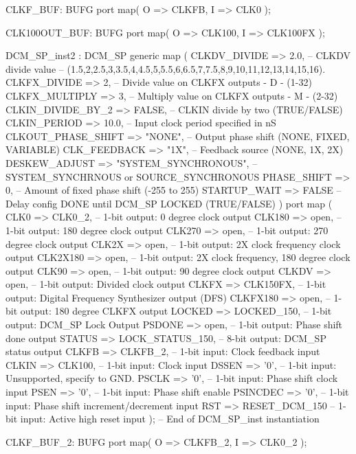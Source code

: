 \begin{mylisting}[language=VHDL,caption=トップモジュール,label=appF_Top_module_VHDL]
{{{	CLKF_BUF: BUFG
		port map(
			O => CLKFB,
			I => CLK0
			);

	CLK100OUT_BUF: BUFG
	port map(
			O	=> CLK100,
			I	=> CLK100FX
			);



	DCM_SP_inst2 : DCM_SP
		generic map (
			CLKDV_DIVIDE 			=> 2.0, 					-- CLKDV divide value
																-- (1.5,2,2.5,3,3.5,4,4.5,5,5.5,6,6.5,7,7.5,8,9,10,11,12,13,14,15,16).
			CLKFX_DIVIDE 			=> 2, 						-- Divide value on CLKFX outputs - D - (1-32)
			CLKFX_MULTIPLY 			=> 3, 						-- Multiply value on CLKFX outputs - M - (2-32)
			CLKIN_DIVIDE_BY_2 		=> FALSE, 					-- CLKIN divide by two (TRUE/FALSE)
			CLKIN_PERIOD 			=> 10.0, 					-- Input clock period specified in nS
			CLKOUT_PHASE_SHIFT 		=> "NONE", 					-- Output phase shift (NONE, FIXED, VARIABLE)
			CLK_FEEDBACK 			=> "1X", 					-- Feedback source (NONE, 1X, 2X)
			DESKEW_ADJUST 			=> "SYSTEM_SYNCHRONOUS", 	-- SYSTEM_SYNCHRNOUS or SOURCE_SYNCHRONOUS
			PHASE_SHIFT 			=> 0, 						-- Amount of fixed phase shift (-255 to 255)
			STARTUP_WAIT 			=> FALSE 					-- Delay config DONE until DCM_SP LOCKED (TRUE/FALSE)
		)
		port map (
			CLK0 		=> CLK0_2, 						-- 1-bit output: 0 degree clock output
			CLK180 		=> open, 						-- 1-bit output: 180 degree clock output
			CLK270 		=> open, 						-- 1-bit output: 270 degree clock output
			CLK2X 		=> open, 						-- 1-bit output: 2X clock frequency clock output
			CLK2X180 	=> open, 						-- 1-bit output: 2X clock frequency, 180 degree clock output
			CLK90 		=> open, 						-- 1-bit output: 90 degree clock output
			CLKDV 		=> open, 						-- 1-bit output: Divided clock output
			CLKFX 		=> CLK150FX, 					-- 1-bit output: Digital Frequency Synthesizer output (DFS)
			CLKFX180 	=> open, 						-- 1-bit output: 180 degree CLKFX output
			LOCKED 		=> LOCKED_150, 					-- 1-bit output: DCM_SP Lock Output
			PSDONE 		=> open, 						-- 1-bit output: Phase shift done output
			STATUS 		=> LOCK_STATUS_150, 			-- 8-bit output: DCM_SP status output
			CLKFB 		=> CLKFB_2,						-- 1-bit input: Clock feedback input
			CLKIN 		=> CLK100, 						-- 1-bit input: Clock input
			DSSEN 		=> '0', 						-- 1-bit input: Unsupported, specify to GND.
			PSCLK 		=> '0', 						-- 1-bit input: Phase shift clock input
			PSEN 		=> '0', 						-- 1-bit input: Phase shift enable
			PSINCDEC 	=> '0', 						-- 1-bit input: Phase shift increment/decrement input
			RST 		=> RESET_DCM_150 				-- 1-bit input: Active high reset input
		);
-- End of DCM_SP_inst instantiation

	CLKF_BUF_2: BUFG
		port map(
			O => CLKFB_2,
			I => CLK0_2
			);

}}}
\end{mylisting}
